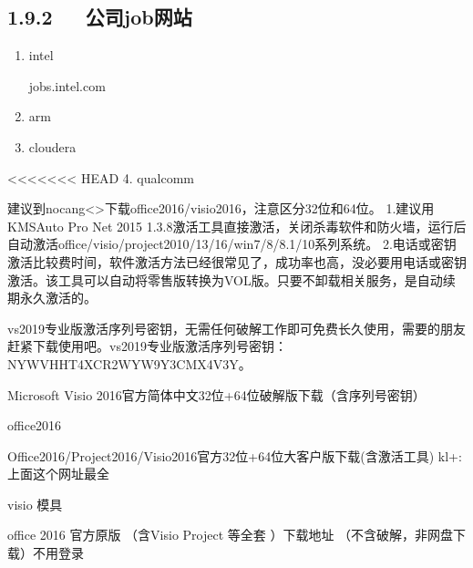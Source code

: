 \documentclass[letterpaper,12pt,english]{sphinxmanual}
\begin{document}
\subsection{1.9.2   公司job网站}
\label{\detokenize{000misc/memo:job}}\begin{enumerate}
%
\item {} 
intel

jobs.intel.com

\item {} 
arm

\item {} 
cloudera

\end{enumerate}

<<<<<<< HEAD
4. qualcomm
\begin{quote}

\end{quote}

建议到nocang<>下载office2016/visio2016，注意区分32位和64位。
1.建议用KMSAuto Pro Net 2015 1.3.8激活工具直接激活，关闭杀毒软件和防火墙，运行后自动激活office/visio/project2010/13/16/win7/8/8.1/10系列系统。
2.电话或密钥激活比较费时间，软件激活方法已经很常见了，成功率也高，没必要用电话或密钥激活。该工具可以自动将零售版转换为VOL版。只要不卸载相关服务，是自动续期永久激活的。

vs2019专业版激活序列号密钥，无需任何破解工作即可免费长久使用，需要的朋友赶紧下载使用吧。vs2019专业版激活序列号密钥：NYWVH\sphinxhyphen{}HT4XC\sphinxhyphen{}R2WYW\sphinxhyphen{}9Y3CM\sphinxhyphen{}X4V3Y。

Microsoft Visio 2016官方简体中文32位+64位破解版下载（含序列号密钥）

office2016

Office2016/Project2016/Visio2016官方32位+64位大客户版下载(含激活工具)
kl+:上面这个网址最全

visio 模具

office 2016 官方原版 （含Visio Project 等全套 ）下载地址 （不含破解，非网盘下载）不用登录
\end{document}
